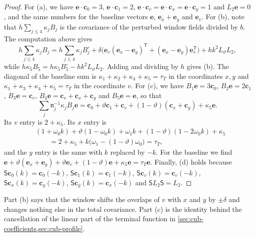 \begin{proof}
For (a), we have $\mathbf e\cdot\mathbf c_0=3$, $\mathbf e\cdot\mathbf c_1=2$,
$\mathbf e\cdot\mathbf c_v=\mathbf e\cdot\mathbf c_x=\mathbf e\cdot\mathbf c_y=1$
and $L_2\mathbf e=0$, and the same numbers for the baseline vectors
$\mathbf e$, $\mathbf e_x+\mathbf e_y$ and $\mathbf e_v$. For (b), note that
$h\sum_{j\le4}\kappa_jB_j$ is the covariance of the perturbed window fields
divided by $b$. The computation above gives
\[
 h\sum_{j\le4}\kappa_jB_j=h\sum_{j\le4}\kappa_jB_j^\circ
 +\delta\bigl(\mathbf e_v(\mathbf e_x-\mathbf e_y)^{\mathsf T}
 +(\mathbf e_x-\mathbf e_y)\mathbf e_v^{\mathsf T}\bigr)+hk^2L_\vartheta L_2,
\]
while $h\kappa_5B_5=h\kappa_5B_5^\circ-hk^2L_\vartheta L_2$. Adding and
dividing by $h$ gives (b). The diagonal of the baseline sum is
$\kappa_1+\kappa_2+\kappa_4+\kappa_5=\tau_T$ in the coordinates $x,y$ and
$\kappa_1+\kappa_3+\kappa_4+\kappa_5=\tau_T$ in the coordinate $v$. For (c),
we have $B_1\mathbf e=3\mathbf c_0$, $B_2\mathbf e=2\mathbf c_1$,
$B_3\mathbf e=\mathbf c_v$, $B_4\mathbf e=\mathbf c_v+\mathbf c_x+\mathbf c_y$
and $B_5\mathbf e=\mathbf e$, so that
\[
 \sum_j\mathfrak n_j^{-1}\kappa_jB_j\mathbf e
 =\mathbf c_0+\vartheta\mathbf c_1+\mathbf c_v
 +(1-\vartheta)(\mathbf c_x+\mathbf c_y)+\kappa_5\mathbf e.
\]
Its $v$ entry is $2+\kappa_5$. Its $x$ entry is
\[
\begin{aligned}
 &(1+\omega_0k)+\vartheta(1-\omega_0k)+\omega_1k+(1-\vartheta)(1-2\omega_0k)
 +\kappa_5\\
 &\qquad=2+\kappa_5+k\bigl(\omega_1-(1-\vartheta)\omega_0\bigr)=\tau_T,
\end{aligned}
\]
and the $y$ entry is the same with $k$ replaced by $-k$. For the baseline we
find $\mathbf e+\vartheta(\mathbf e_x+\mathbf e_y)+\vartheta\mathbf e_v
+(1-\vartheta)\mathbf e+\kappa_5\mathbf e=\tau_T\mathbf e$. Finally, (d)
holds because $\mathsf S\mathbf c_0(k)=\mathbf c_0(-k)$, $\mathsf S\mathbf
c_1(k)=\mathbf c_1(-k)$, $\mathsf S\mathbf c_v(k)=\mathbf c_v(-k)$, $\mathsf
S\mathbf c_x(k)=\mathbf c_y(-k)$, $\mathsf S\mathbf c_y(k)=\mathbf c_x(-k)$ and
$\mathsf SL_2\mathsf S=L_2$.
\end{proof}

Part (b) says that the window shifts the overlaps of $v$ with $x$ and $y$ by
$\pm\delta$ and changes nothing else in the total covariance. Part (c) is the
identity behind the cancellation of the linear part of the terminal function
in \cref{sec:cub-coefficients,sec:cub-profile}.

